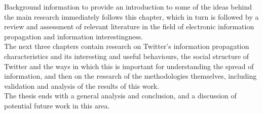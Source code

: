Background information to provide an introduction to some of the ideas behind the main research immediately follows this chapter, which in turn is followed by a review and assessment of relevant literature in the field of electronic information propagation and information interestingness.\\
The next three chapters contain research on Twitter's information propagation characteristics and its interesting and useful behaviours, the social structure of Twitter and the ways in which this is important for understanding the spread of information, and then on the research of the methodologies themselves, including validation and analysis of the results of this work.\\
The thesis ends with a general analysis and conclusion, and a discussion of potential future work in this area.